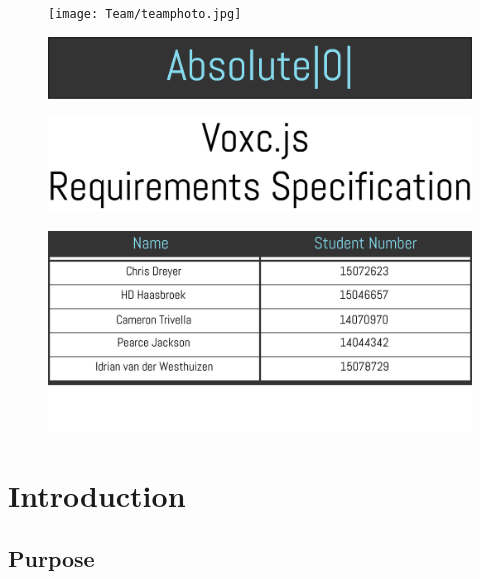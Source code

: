 \documentclass[english]{article}
\begin{document}
	
	
	\begin{figure}[H]
		\texttt{[image: Team/teamphoto.jpg]}
	\end{figure}

	\begin{figure}[H]
		\includegraphics[width=\linewidth]{Team/teamtitle.jpg}
	\end{figure}

	\begin{figure}[H]
		\includegraphics[width=\linewidth]{documenttitle.jpg}
	\end{figure}

	\begin{figure}[H]
		\includegraphics[width=\linewidth]{Team/teamtable.jpg}
	\end{figure}
	
	\newpage
	\tableofcontents
	
	\newpage

	\section{Introduction}
	
		\subsection{Purpose}
		
\end{document}
